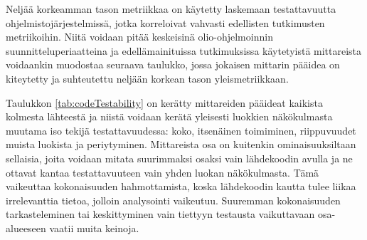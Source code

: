 \documentclass[finnish]{tktltiki2}
\numberwithin{table}{section}
\theoremstyle{definition}
\theoremstyle{remark}
\begin{document}
Neljää korkeamman tason metriikkaa on käytetty laskemaan testattavuutta ohjelmistojärjestelmissä, jotka korreloivat vahvasti edellisten tutkimusten metriikoihin. Niitä voidaan pitää keskeisinä olio-ohjelmoinnin suunnitteluperiaatteina \citep{Khan:2009:MBT:1507195.1507204} ja edellämainituissa tutkimuksissa käytetyistä mittareista voidaankin muodostaa seuraava taulukko, jossa jokaisen mittarin pääidea on kiteytetty ja suhteutettu neljään korkean tason yleismetriikkaan.

\begin{table}[ht]
\centering
	\setlength{\extrarowheight}{4pt}%
\end{table}



\noindent
Taulukkon \ref{tab:codeTestability} on kerätty mittareiden pääideat kaikista kolmesta lähteestä ja niistä voidaan kerätä yleisesti luokkien näkökulmasta muutama iso tekijä testattavuudessa: koko, itsenäinen toimiminen, riippuvuudet muista luokista ja periytyminen. Mittareista osa on kuitenkin ominaisuuksiltaan sellaisia, joita voidaan mitata suurimmaksi osaksi vain lähdekoodin avulla ja ne ottavat kantaa testattavuuteen vain yhden luokan näkökulmasta. Tämä vaikeuttaa kokonaisuuden hahmottamista, koska lähdekoodin kautta tulee liikaa irrelevanttia tietoa, jolloin analysointi vaikeutuu. Suuremman kokonaisuuden tarkasteleminen tai keskittyminen vain tiettyyn testausta vaikuttavaan osa-alueeseen vaatii muita keinoja.
\end{document}

